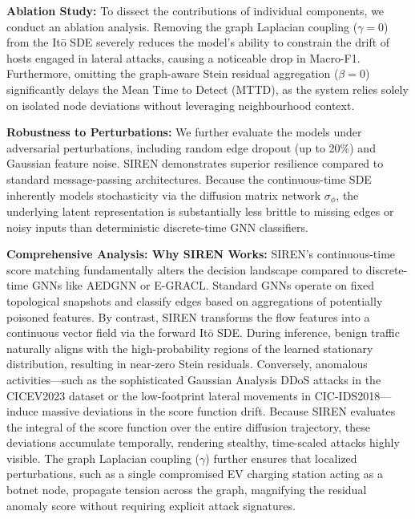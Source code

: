 \textbf{Ablation Study:} To dissect the contributions of individual components, we conduct an ablation analysis. Removing the graph Laplacian coupling ($\gamma=0$) from the It\=o SDE severely reduces the model's ability to constrain the drift of hosts engaged in lateral attacks, causing a noticeable drop in Macro-F1. Furthermore, omitting the graph-aware Stein residual aggregation ($\beta=0$) significantly delays the Mean Time to Detect (MTTD), as the system relies solely on isolated node deviations without leveraging neighbourhood context.

\textbf{Robustness to Perturbations:} We further evaluate the models under adversarial perturbations, including random edge dropout (up to 20\%) and Gaussian feature noise. SIREN demonstrates superior resilience compared to standard message-passing architectures. Because the continuous-time SDE inherently models stochasticity via the diffusion matrix network $\sigma_\phi$, the underlying latent representation is substantially less brittle to missing edges or noisy inputs than deterministic discrete-time GNN classifiers.

\textbf{Comprehensive Analysis: Why SIREN Works:}
SIREN's continuous-time score matching fundamentally alters the decision landscape compared to discrete-time GNNs like AEDGNN or E-GRACL. Standard GNNs operate on fixed topological snapshots and classify edges based on aggregations of potentially poisoned features. By contrast, SIREN transforms the flow features into a continuous vector field via the forward It\=o SDE. During inference, benign traffic naturally aligns with the high-probability regions of the learned stationary distribution, resulting in near-zero Stein residuals. Conversely, anomalous activities---such as the sophisticated Gaussian Analysis DDoS attacks in the CICEV2023 dataset or the low-footprint lateral movements in CIC-IDS2018---induce massive deviations in the score function drift. Because SIREN evaluates the integral of the score function over the entire diffusion trajectory, these deviations accumulate temporally, rendering stealthy, time-scaled attacks highly visible. The graph Laplacian coupling ($\gamma$) further ensures that localized perturbations, such as a single compromised EV charging station acting as a botnet node, propagate tension across the graph, magnifying the residual anomaly score without requiring explicit attack signatures.

